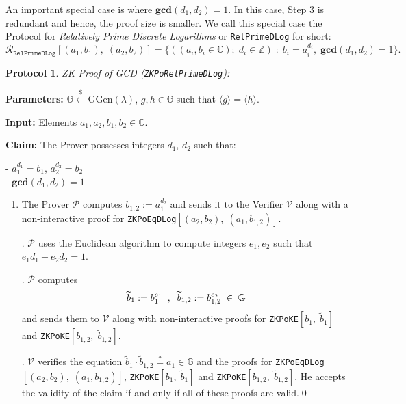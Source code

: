 \documentclass[11pt, lettersize, notitlepage, leqno, footskip=0.6cm]{article}
\newcommand{\bz}{\mathbb Z}
\newcommand{\ttt}{\texttt}
\newcommand{\bG}{\mathbb{G}}
\newcommand{\la}{\langle}
\newcommand{\ra}{\rangle}
\newcommand{\wti}{\widetilde}
\newcommand{\mc}{\mathcal}
\newcommand{\mb}{\mathbb}
\newcommand{\mbf}{\mathbf}
\newcommand{\mr}{\mathrm}
\newcommand{\lamb}{\lambda}
\newcommand{\V}{\mc{V}}
\newcommand{\vs}{\vspace{-0.15cm}}
\newcommand{\noin}{\noindent}
\newcommand{\GCD}{\mbf{gcd}}
\newtheorem{Prot}[Thm]{Protocol}
\numberwithin{equation}{section}
\begin{document}
\begin{prf} \end{prf}


\noin An important special case is where $\GCD(d_1, d_2) = 1$. In this case, Step 3 is redundant and hence, the proof size is smaller. We call this special case the Protocol for \textit{Relatively Prime Discrete Logarithms} or \verb|RelPrimeDLog| for short:\vs \[\mc{R}_{{\ttt{RelPrimeDLog}}}[(a_1,b_1),\;(a_2,b_2)] = \big\{((a_i, b_i\in\mb{G});\;d_i\in\bz)\;:\; b_i = a_i^{d_i},\;\GCD(d_1,d_2)=1 \big\} .\] 



\begin{Prot} \normalfont \hypertarget{GCDPed}{\textit{ZK Proof of GCD}} (\verb|ZKPoRelPrimeDLog|):\end{Prot} \vspace{-0.3cm}

\noin \textbf{Parameters:} $\mb{G}\xleftarrow{\$} \mr{GGen}(\lamb)$,  $g,h\in \mb{G}$ such that $\la g \ra = \la h \ra$.

\noin \textbf{Input:} Elements $a_1, a_2, b_1, b_2 \in \mb{G}$. 

\noin \textbf{Claim:} The Prover possesses integers $d_1$, $d_2$ such that:

\noin - $a_1^{d_1} = b_1$, $a_2^{d_2} = b_2$\\
\noin - $\GCD(d_1, d_2) = 1$
 

\begin{enumerate}[wide, labelwidth=!, labelindent=0pt]\vs \item The Prover $\mc{P}$ computes $b_{1,2}:= a_1^{d_2}$ and sends it to the Verifier $\V$ along with a\\ non-interactive proof for \verb|ZKPoEqDLog|$[(a_2, b_2),\; (a_1, b_{1,2})]$.

\noin 2. $\mc{P}$ uses the Euclidean algorithm to compute integers $e_1, e_2$ such that $e_1d_1 + e_2d_2 = 1$.

\noin 3. $\mc{P}$ computes \vs $$\wti{b}_1:= b_1^{e_1}\;\;,\;\; \wti{b}_{1,2}:= b_{1,2}^{e_2}\;\in\;\bG \vs $$ and sends them to $\V$ along with non-interactive proofs for \verb|ZKPoKE|$[b_1,\; \wti{b}_1]$ and \verb|ZKPoKE|$[b_{1,2},\; \wti{b}_{1,2}]$.

\noin 4. $\mc{V}$ verifies the equation $\wti{b}_1\cdot\wti{b}_{1,2}\stackrel{?}{=} a_1\in\bG $ and the proofs for \verb|ZKPoEqDLog|$[(a_2, b_2),\; (a_1, b_{1,2})]$, \verb|ZKPoKE|$[b_1,\; \wti{b}_1]$ and \verb|ZKPoKE|$[b_{1,2},\; \wti{b}_{1,2}]$. He accepts the validity of the claim if and only if all of these proofs are valid.\qed \end{enumerate}
\end{document}
